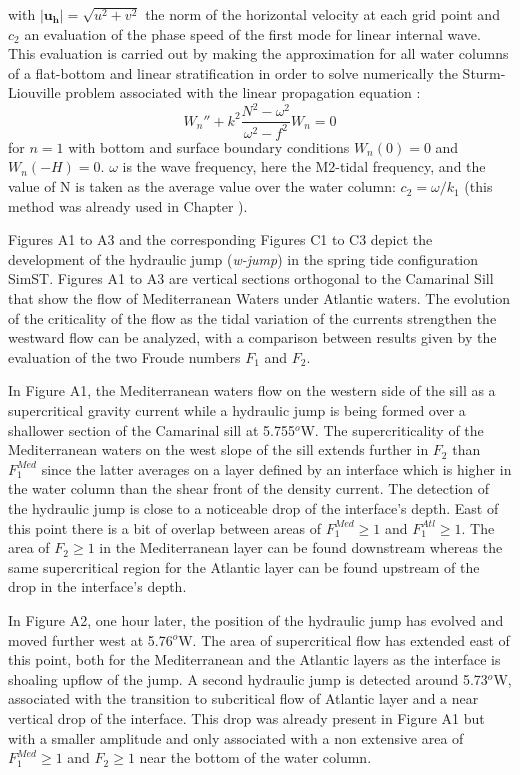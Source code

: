 \noindent with $\lvert \mathbf{u_h} \rvert=\sqrt{u^2+v^2}$ the norm of the horizontal velocity at each grid point and $c_2$ an evaluation of the phase speed of the first mode for linear internal wave. This evaluation is carried out by making the approximation for all water columns of a flat-bottom and linear stratification in order to solve numerically the Sturm-Liouville problem associated with the linear propagation equation \citep{gill_atmosphere-ocean_1982}:
\begin{equation}
 W_n'' + k^2 \frac{N^2 - \omega^2}{\omega ^2 - f^2}W_n = 0
\end{equation}
for $n=1$ with bottom and surface boundary conditions $W_n(0) = 0$ and $W_n(-H) = 0$. $\omega$ is the wave frequency, here the M2-tidal frequency, and the value of N is taken as the average value over the water column: $c_2=\omega / k_1 $ (this method was already used in Chapter ).

Figures A1 to A3 and the corresponding Figures C1 to C3 depict the development of the hydraulic jump (\textit{w-jump}) in the spring tide configuration SimST. Figures A1 to A3 are vertical sections orthogonal to the Camarinal Sill that show the flow of Mediterranean Waters under Atlantic waters. The evolution of the criticality of the flow as the tidal variation of the currents strengthen the westward flow can be analyzed, with a comparison between results given by the evaluation of the two Froude numbers $F_1$ and $F_2$. 

In Figure A1, the Mediterranean waters flow on the western side of the sill as a supercritical gravity current while a hydraulic jump is being formed over a shallower section of the Camarinal sill at 5.755$^{o}$W. The supercriticality of the Mediterranean waters on the west slope of the sill extends further in $F_2$ than $F_1^{Med}$ since the latter averages on a layer defined by an interface which is higher in the water column than the shear front of the density current. The detection of the hydraulic jump is close to a noticeable drop of the interface's depth. East of this point there is a bit of overlap between areas of $F_1^{Med} \geq 1$ and $F_1^{Atl} \geq 1$. The area of $F_2 \geq 1$ in the Mediterranean layer can be found downstream whereas the same supercritical region for the Atlantic layer can be found upstream of the drop in the interface's depth.

In Figure A2, one hour later, the position of the hydraulic jump has evolved and moved further west at 5.76$^o$W. The area of supercritical flow has extended east of this point, both for the Mediterranean and the Atlantic layers as the interface is shoaling upflow of the jump. A second hydraulic jump is detected around 5.73$^o$W, associated with the transition to subcritical flow of Atlantic layer and a near vertical drop of the interface. This drop was already present in Figure A1 but with a smaller amplitude and only associated with a non extensive area of $F^{Med}_1 \geq 1$ and $F_2 \geq 1$ near the bottom of the water column.%

